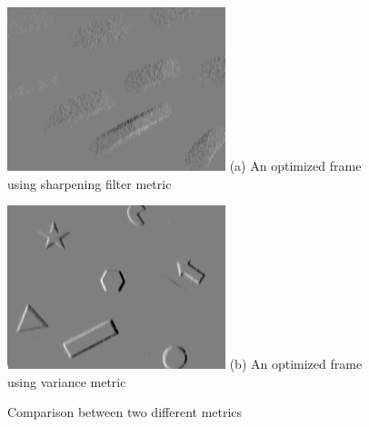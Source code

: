 \begin{figure}
  \begin{minipage}[t]{0.48\textwidth}
    \centering \includegraphics[width =
    \textwidth]{images/high_pass_contrast.png}
    (a) An optimized frame using sharpening filter metric
  \end{minipage}
  \hfill
  \begin{minipage}[t]{0.48\textwidth}
    \centering \includegraphics[width =
    \textwidth]{images/variance_contrast.png}
    (b) An optimized frame using variance metric
  \end{minipage}
  \caption{Comparison between two different metrics}
  \label{fig:contrast}
\end{figure}




